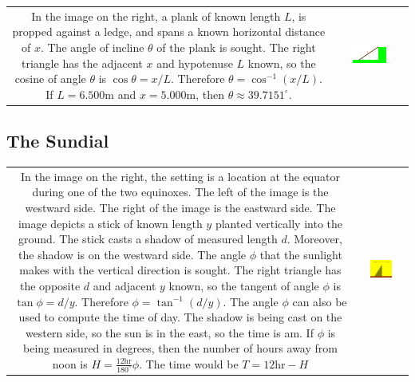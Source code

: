 \documentclass{article}
\begin{document}
\begin{tabular}{cc}
\parbox{0.5\textwidth}{
In the image on the right, a plank of known length \(L\), is propped against a ledge, and spans a known horizontal distance of \(x\). The angle of incline \(\theta\) of the plank is sought. The right triangle has the adjacent \(x\) and hypotenuse \(L\) known, so the cosine of angle \(\theta\) is \(\cos\theta = x/L\). Therefore \(\theta = \cos^{-1}(x/L)\). If \(L = 6.500\text{m}\) and \(x = 5.000\text{m}\), then \(\theta \approx 39.7151^\circ\). 
} & \parbox{0.5\textwidth}{
\includegraphics[width = 0.5\textwidth]{leaning_plank_2}
}
\end{tabular}



\subsection{The Sundial}

\begin{tabular}{cc}
\parbox{0.5\textwidth}{
In the image on the right, the setting is a location at the equator during one of the two equinoxes. The left of the image is the westward side. The right of the image is the eastward side. The image depicts a stick of known length \(y\) planted vertically into the ground. The stick casts a shadow of measured length \(d\). Moreover, the shadow is on the westward side. The angle \(\phi\) that the sunlight makes with the vertical direction is sought. The right triangle has the opposite \(d\) and adjacent \(y\) known, so the tangent of angle \(\phi\) is \(\tan\phi = d/y\). Therefore \(\phi = \tan^{-1}(d/y)\). The angle \(\phi\) can also be used to compute the time of day. The shadow is being cast on the western side, so the sun is in the east, so the time is am. If \(\phi\) is being measured in degrees, then the number of hours away from noon is \(H = \frac{12\text{hr}}{180^\circ}\phi\). The time would be \(T = 12\text{hr} - H\)
} & \parbox{0.5\textwidth}{
\includegraphics[width = 0.5\textwidth]{sundial}
}
\end{tabular}
\end{document}
